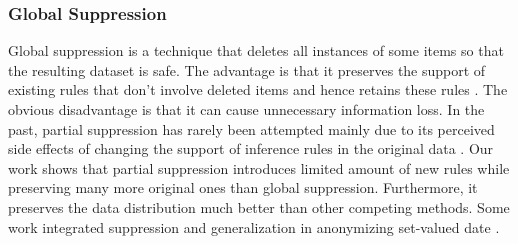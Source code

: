 \begin{table*}[thb]
\caption{The Same Dataset in Table \ref{tab:sample} and Generalization Anonymization Result
\label{tab:samesample}}
\centering
{}

\end{table*}

\subsubsection{Global Suppression}

Global suppression is a technique that deletes all instances of some items
so that the resulting dataset is safe.
The advantage is that it preserves the support of
existing rules that don't involve deleted items and hence retains these rules
\cite{Xu:2008:ATD}. The obvious disadvantage is that it can cause unnecessary
information loss. In the past, partial suppression
has rarely been attempted mainly due to its perceived side effects of
changing the support of inference rules in the original data
\cite{Xu:2008:ATD,Cao:2010:rho,tkde:VerykiosEBSD04:ARH,tkde:WuCC07:hiding}.
Our work shows that partial suppression introduces limited
amount of new rules while preserving many more original ones than
global suppression. Furthermore,
it preserves the data distribution much better than
other competing methods.
Some work integrated suppression and generalization in anonymizing set-valued date \cite{liu2010anonymizing,Cao:2010:rho}.
